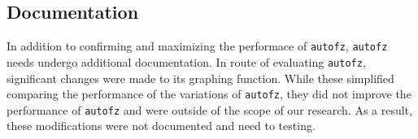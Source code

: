 \subsection{Documentation} In addition to confirming and maximizing the performace of \texttt{autofz},
\texttt{autofz} needs undergo additional documentation. In route of evaluating \texttt{autofz}, significant 
changes were made to its graphing function. While these simplified comparing the performance of the variations
of \texttt{autofz}, they did not improve the performance of \texttt{autofz} and were outside of the scope of our research.
As a result, these modifications were not documented and need to testing. 



